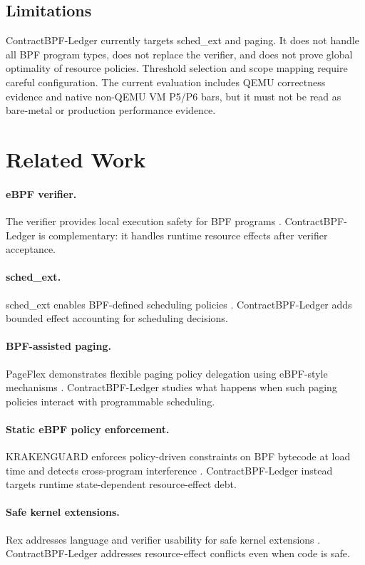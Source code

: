 \documentclass[letterpaper,twocolumn,10pt]{article}
\newcommand{\sys}{ContractBPF-Ledger\xspace}
\begin{document}
\subsection{Limitations}

\sys currently targets sched\_ext and paging. It does not handle all BPF program types, does not replace the verifier, and does not prove global optimality of resource policies. Threshold selection and scope mapping require careful configuration. The current evaluation includes QEMU correctness evidence and native non-QEMU VM P5/P6 bars, but it must not be read as bare-metal or production performance evidence.

\section{Related Work}

\paragraph{eBPF verifier.}
The verifier provides local execution safety for BPF programs \cite{linuxVerifier}. \sys is complementary: it handles runtime resource effects after verifier acceptance.

\paragraph{sched\_ext.}
sched\_ext enables BPF-defined scheduling policies \cite{linuxSchedExt}. \sys adds bounded effect accounting for scheduling decisions.

\paragraph{BPF-assisted paging.}
PageFlex demonstrates flexible paging policy delegation using eBPF-style mechanisms \cite{pageflex2025}. \sys studies what happens when such paging policies interact with programmable scheduling.

\paragraph{Static eBPF policy enforcement.}
KRAKENGUARD enforces policy-driven constraints on BPF bytecode at load time and detects cross-program interference \cite{krakenguard2026}. \sys instead targets runtime state-dependent resource-effect debt.

\paragraph{Safe kernel extensions.}
Rex addresses language and verifier usability for safe kernel extensions \cite{rex2025}. \sys addresses resource-effect conflicts even when code is safe.
\end{document}

